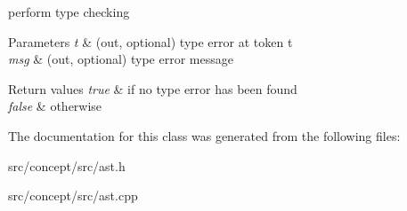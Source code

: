 perform type checking 


\begin{DoxyParams}{Parameters}
{\em t} & (out, optional) type error at token t \\
\hline
{\em msg} & (out, optional) type error message \\
\hline
\end{DoxyParams}

\begin{DoxyRetVals}{Return values}
{\em true} & if no type error has been found \\
\hline
{\em false} & otherwise \\
\hline
\end{DoxyRetVals}


The documentation for this class was generated from the following files\-:\begin{DoxyCompactItemize}
\item 
src/concept/src/ast.\-h\item 
src/concept/src/ast.\-cpp\end{DoxyCompactItemize}
